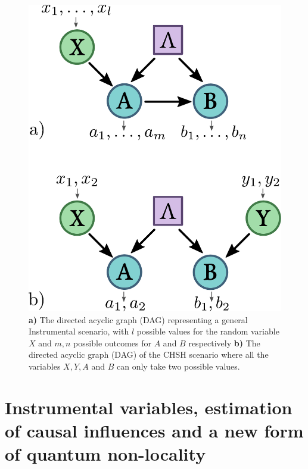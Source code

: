 \documentclass[letterpaper]{article}
\begin{document}
\begin{figure}[h]
    \centering
    \includegraphics[width=.8\columnwidth]{images/chsh_inst_dag.pdf}
        \caption{
    \textbf{a)} The directed acyclic graph (DAG) representing a general
    Instrumental scenario, with $l$ possible values for the random variable $X$
    and $m,n$ possible outcomes for $A$ and $B$ respectively
    \textbf{b)} The directed acyclic graph (DAG) of the CHSH scenario where all the
    variables $X,Y,A$ and $B$ can only take two possible values.
}
    \label{fig:chshinstdag}

\end{figure} 

\section*{Instrumental variables, estimation of causal influences and a new form of quantum non-locality}
\end{document}
